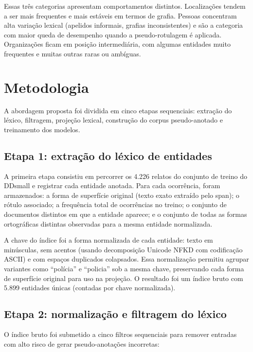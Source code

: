 \documentclass[12pt,a4paper]{article}
\begin{document}
Essas três categorias apresentam comportamentos distintos. Localizações tendem a
ser mais frequentes e mais estáveis em termos de grafia. Pessoas concentram alta
variação lexical (apelidos informais, grafias inconsistentes) e são a categoria
com maior queda de desempenho quando a pseudo-rotulagem é aplicada. Organizações
ficam em posição intermediária, com algumas entidades muito frequentes e muitas
outras raras ou ambíguas.

\section{Metodologia}

A abordagem proposta foi dividida em cinco etapas sequenciais: extração do léxico,
filtragem, projeção lexical, construção do corpus pseudo-anotado e treinamento
dos modelos.

\subsection{Etapa 1: extração do léxico de entidades}

A primeira etapa consistiu em percorrer os 4.226 relatos do conjunto de treino
do DDsmall e registrar cada entidade anotada. Para cada ocorrência, foram
armazenados: a forma de superfície original (texto exato extraído pelo span); o
rótulo associado; a frequência total de ocorrências no treino; o conjunto de
documentos distintos em que a entidade aparece; e o conjunto de todas as formas
ortográficas distintas observadas para a mesma entidade normalizada.

A chave do índice foi a forma normalizada de cada entidade: texto em minúsculas,
sem acentos (usando decomposição Unicode NFKD com codificação ASCII) e com espaços
duplicados colapsados. Essa normalização permitiu agrupar variantes como
``polícia'' e ``policia'' sob a mesma chave, preservando cada forma de superfície
original para uso na projeção. O resultado foi um índice bruto com 5.899 entidades
únicas (contadas por chave normalizada).

\subsection{Etapa 2: normalização e filtragem do léxico}

O índice bruto foi submetido a cinco filtros sequenciais para remover entradas
com alto risco de gerar pseudo-anotações incorretas:
\end{document}
